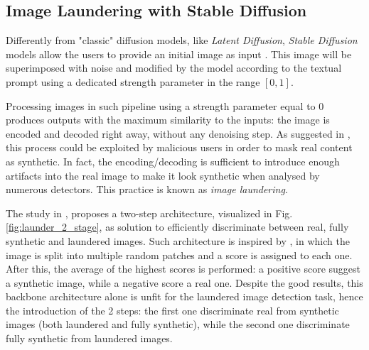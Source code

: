 \documentclass[conference]{IEEEtran} %
\begin{document}
    \subsection{Image Laundering with Stable Diffusion}
        \label{sec:laundering}
        Differently from "classic" diffusion models, like \textit{Latent Diffusion}, \textit{Stable Diffusion} models allow the users to provide an initial image as input \cite{sd1_github} \cite{sd2_github} \cite{podell2023sdxl} \cite{sauer2023adversarial-sdxl-turbo}. This image will be superimposed with noise and modified by the model according to the textual prompt using a dedicated strength parameter in the range $[0, 1]$.

        Processing images in such pipeline using a strength parameter equal to 0 produces outputs with the maximum similarity to the inputs: the image is encoded and decoded right away, without any denoising step. As suggested in \cite{mandelli2024synthetic}, this process could be exploited by malicious users in order to mask real content as synthetic. In fact, the encoding/decoding is sufficient to introduce enough artifacts into the real image to make it look synthetic when analysed by numerous detectors. This practice is known as \textit{image laundering}.

        The study in \cite{mandelli2024synthetic}, proposes a two-step architecture, visualized in Fig. \ref{fig:launder_2_stage}, as solution to efficiently discriminate between real, fully synthetic and laundered images. Such architecture is inspired by \cite{mandelli2022detecting}, in which the image is split into multiple random patches and a score is assigned to each one. After this, the average of the highest scores is performed: a positive score suggest a synthetic image, while a negative score a real one. Despite the good results, this backbone architecture alone is unfit for the laundered image detection task, hence the introduction of the 2 steps: the first one discriminate real from synthetic images (both laundered and fully synthetic), while the second one discriminate fully synthetic from laundered images.
\end{document}
